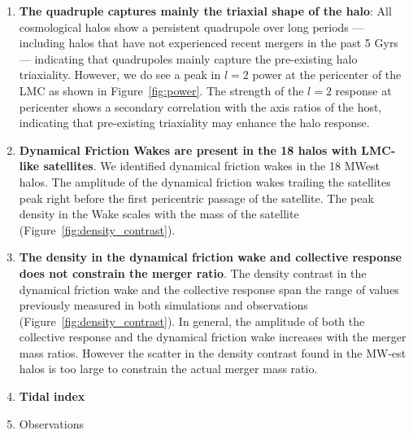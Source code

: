 \documentclass[twocolumn, linenumbers]{openjournal}
\begin{document}
\begin{enumerate}
    \item \textbf{The quadruple captures mainly the triaxial shape of the halo}:
    All cosmological halos show a persistent quadrupole over long periods ---
    including halos that have not experienced recent mergers in the past 5 Gyrs --- 
    indicating that quadrupoles mainly capture the pre-existing halo triaxiality. However, 
    we do see a peak in $l=2$ power at the pericenter of the LMC as shown in
    Figure~\ref{fig:power}. The strength of the $l=2$ response at pericenter shows a secondary 
    correlation with the axis ratios of the host, indicating that pre-existing triaxiality may 
    enhance the halo response.  

    \item \textbf{Dynamical Friction Wakes are present in the 18 halos with LMC-like satellites}.
    We identified dynamical friction wakes in the 18 MWest halos. The amplitude of the dynamical friction wakes 
    trailing the satellites peak right before the first pericentric passage of the satellite. The peak density 
    in the Wake scales with the mass of the satellite (Figure~\ref{fig:density_contrast}).   

    \item \textbf{The density in the dynamical friction wake and collective response does not constrain the merger ratio}. 
    The density contrast in the dynamical friction wake and the collective response span the range of values previously
    measured in both simulations and observations (Figure~\ref{fig:density_contrast}). In general, the amplitude of both the 
    collective response and the dynamical friction wake increases with the merger mass ratios. However the scatter in the 
    density contrast found in the MW-est halos is too large to constrain the actual merger mass ratio.

    \item \textbf{Tidal index}


    \item Observations
     

 
    
\end{enumerate}
\end{document}
